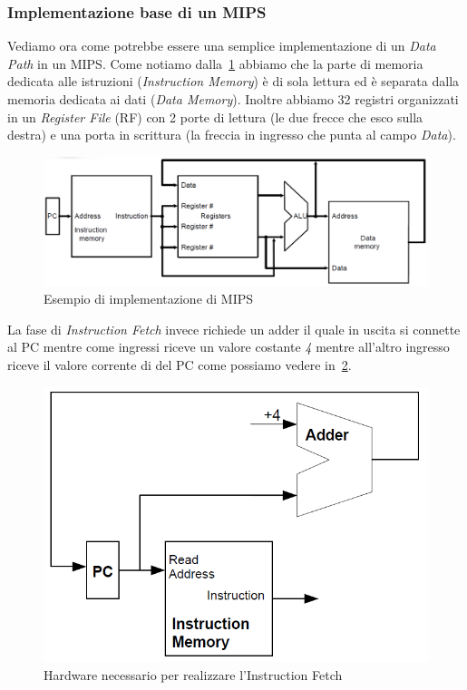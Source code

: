 \subsubsection{Implementazione base di un MIPS}
Vediamo ora come potrebbe essere una semplice implementazione di un \emph{Data Path} in un MIPS. Come notiamo dalla \figurename\,\ref{fig:mips} abbiamo che la parte di memoria dedicata alle istruzioni (\emph{Instruction Memory}) è di sola lettura ed è separata dalla memoria dedicata ai dati (\emph{Data Memory}). Inoltre abbiamo 32 registri organizzati in un \emph{Register File} (RF) con 2 porte di lettura (le due frecce che esco sulla destra) e una porta in scrittura (la freccia in ingresso che punta al campo \emph{Data}).
\begin{figure}[htb]
\centering
\includegraphics[scale=0.48]{img/mips.png}
\caption{Esempio di implementazione di MIPS}\label{fig:mips}
\end{figure}
La fase di \emph{Instruction Fetch} invece richiede un adder il quale in uscita si connette al PC mentre come ingressi riceve un valore costante \emph{4} mentre all'altro ingresso riceve il valore corrente di del PC come possiamo vedere in \figurename\,\ref{fig:ifetch}.
\begin{figure}[htb]
\centering
\includegraphics[scale=0.35]{img/ifetch.png}
\caption{Hardware necessario per realizzare l'Instruction Fetch}\label{fig:ifetch}
\end{figure}
